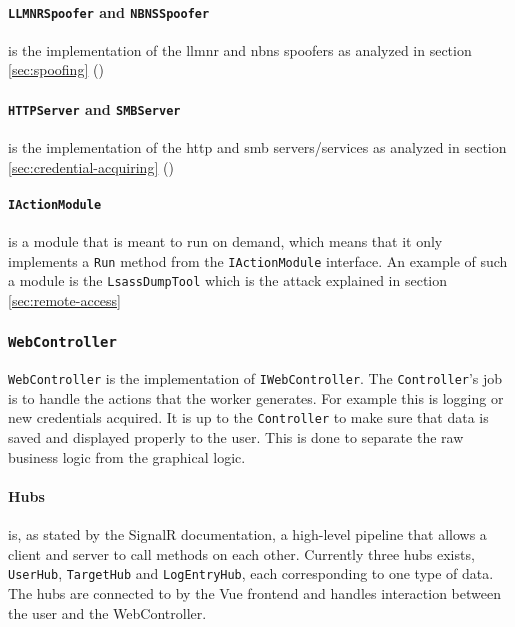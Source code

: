 \documentclass{article}
\begin{document}
\paragraph{\texttt{LLMNRSpoofer} and \texttt{NBNSSpoofer}} is the implementation of the \gls{llmnr} and \gls{nbns} spoofers as analyzed in section \ref{sec:spoofing} ()

\paragraph{\texttt{HTTPServer} and \texttt{SMBServer}} is the implementation of the \gls{http} and \gls{smb} servers/services as analyzed in section \ref{sec:credential-acquiring} ()

\paragraph{\texttt{IActionModule}} is a module that is meant to run on demand, which means that it only implements a \texttt{Run} method from the \texttt{IActionModule} interface. An example of such a module is the \texttt{LsassDumpTool} which is the attack explained in section \ref{sec:remote-access}


\subsubsection{\texttt{WebController}} \texttt{WebController} is the implementation of \texttt{IWebController}. The \texttt{Controller}'s job is to handle the actions that the worker generates. For example this is logging or new credentials acquired. It is up to the \texttt{Controller} to make sure that data is saved and displayed properly to the user. This is done to separate the raw business logic from the graphical logic.

\paragraph{Hubs} is, as stated by the SignalR documentation, a high-level pipeline that allows a client and server to call methods on each other\cite{url:implementation:signalr}. Currently three hubs exists, \texttt{UserHub}, \texttt{TargetHub} and \texttt{LogEntryHub}, each corresponding to one type of data. The hubs are connected to by the Vue frontend and handles interaction between the user and the WebController.
\end{document}
